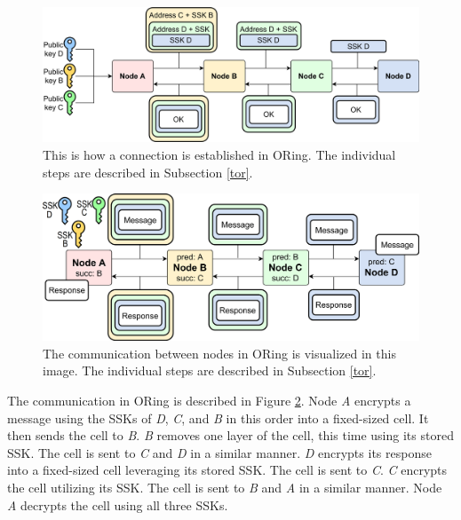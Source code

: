 \begin{figure}[ht!]
  \centering
  \includegraphics[width = \textwidth]{Images/OREstablishment.png}
  \caption{This is how a connection is established in ORing. The individual steps are described in Subsection \ref{tor}.}
  \label{OREstablishment}
\end{figure}

\begin{figure}[ht!]
  \centering
  \includegraphics[width = \textwidth]{Images/ORCom.png}
  \caption{The communication between nodes in ORing is visualized in this image. The individual steps are described in Subsection \ref{tor}.}
  \label{ORCom}
\end{figure}

The communication in ORing is described in Figure \ref{ORCom}. Node \textit{A} encrypts a message using the SSKs of \textit{D}, \textit{C}, and \textit{B} in this order into a fixed-sized cell. It then sends the cell to \textit{B}. \textit{B} removes one layer of the cell, this time using its stored SSK. The cell is sent to \textit{C} and \textit{D} in a similar manner. \textit{D} encrypts its response into a fixed-sized cell leveraging its stored SSK. The cell is sent to \textit{C}. \textit{C} encrypts the cell utilizing its SSK. The cell is sent to \textit{B} and \textit{A} in a similar manner. Node \textit{A} decrypts the cell using all three SSKs. 

